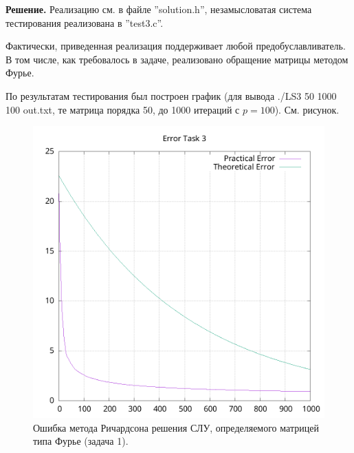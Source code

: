 \documentclass[14pt,a4paper]{extarticle}
\newcommand{\1}{\mathbbm{1}}
\begin{document}
\textbf{Решение.} 
Реализацию см. в файле ''solution.h'', незамысловатая система тестирования реализована в ''test3.c''. \par
Фактически, приведенная реализация поддерживает любой предобуславливатель. В том числе, как требовалось в задаче, 
реализовано обращение матрицы методом Фурье. \par
По результатам тестирования был построен график (для вывода ./LS3 50 1000 100 out.txt, те матрица порядка 50, до 1000 итераций 
с $p = 100$). См. рисунок.

\begin{figure}
    \centering
    \includegraphics[scale=0.55]{Error3.png}
    \caption{Ошибка метода Ричардсона решения СЛУ, определяемого матрицей типа Фурье (задача 1).}
\end{figure}
\end{document}
